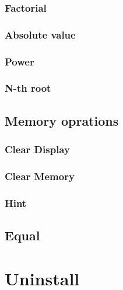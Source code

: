 \documentclass[11pt, a4paper, twocolumn ]{article}
\theoremstyle{definition}
\begin{document}
    \subsubsection{Factorial}

    \subsubsection{Absolute value}

    \subsubsection{Power}

    \subsubsection{N-th root}

    \subsection{Memory oprations}

    \subsubsection{Clear Display }

    \subsubsection{Clear Memory}

    \subsubsection{Hint}
    
    \subsection{Equal}

    \section{Uninstall}
\end{document}
